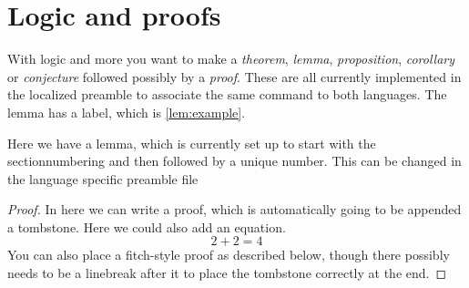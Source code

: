 \documentclass[a4, english, twoside]{article}
\begin{document}
\newpage
\section{Logic and proofs}
With logic and more you want to make a \emph{theorem}, \emph{lemma}, \emph{proposition}, \emph{corollary} or \emph{conjecture} followed possibly by a \emph{proof}. These are all currently implemented in the localized preamble to associate the same command to both languages. The lemma has a label, which is \ref{lem:example}.

\begin{lemma}    \label{lem:example}
    Here we have a lemma, which is currently set up to start with the sectionnumbering and then followed by a unique number. This can be changed in the language specific preamble file
\end{lemma}
\begin{proof}
    In here we can write a proof, which is automatically going to be appended a tombstone. Here we could also add an equation.
    \begin{equation*}
        2+2 = 4
    \end{equation*}
    You can also place a fitch-style proof as described below, though there possibly needs to be a linebreak after it to place the tombstone correctly at the end.
\end{proof}
\end{document}
